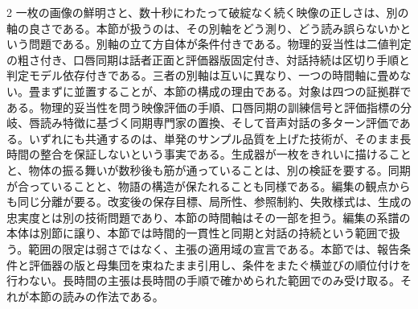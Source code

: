 \documentclass[lualatex,a4paper,10pt]{jlreq}
\begin{document}
\begin{multicols}{2}
\raggedcolumns
一枚の画像の鮮明さと、数十秒にわたって破綻なく続く映像の正しさは、別の軸の良さである。本節が扱うのは、その別軸をどう測り、どう読み誤らないかという問題である\autocite{btd131,btd135}。別軸の立て方自体が条件付きである。物理的妥当性は二値判定の粗さ付き、口唇同期は話者正面と評価器版固定付き、対話持続は区切り手順と判定モデル依存付きである。三者の別軸は互いに異なり、一つの時間軸に畳めない。畳まずに並置することが、本節の構成の理由である。対象は四つの証拠群である。物理的妥当性を問う映像評価の手順、口唇同期の訓練信号と評価指標の分岐、唇読み特徴に基づく同期専門家の置換、そして音声対話の多ターン評価である\autocite{btd131,btd129,btd130,btd135}。いずれにも共通するのは、単発のサンプル品質を上げた技術が、そのまま長時間の整合を保証しないという事実である。生成器が一枚をきれいに描けることと、物体の振る舞いが数秒後も筋が通っていることは、別の検証を要する。同期が合っていることと、物語の構造が保たれることも同様である\autocite{btd131,btd130}。編集の観点からも同じ分離が要る。改変後の保存目標、局所性、参照制約、失敗様式は、生成の忠実度とは別の技術問題であり、本節の時間軸はその一部を担う。編集の系譜の本体は別節に譲り、本節では時間的一貫性と同期と対話の持続という範囲で扱う。範囲の限定は弱さではなく、主張の適用域の宣言である。本節では、報告条件と評価器の版と母集団を束ねたまま引用し、条件をまたぐ横並びの順位付けを行わない。長時間の主張は長時間の手順で確かめられた範囲でのみ受け取る。それが本節の読みの作法である\autocite{btd131,btd135}。


\end{multicols}
\end{document}
